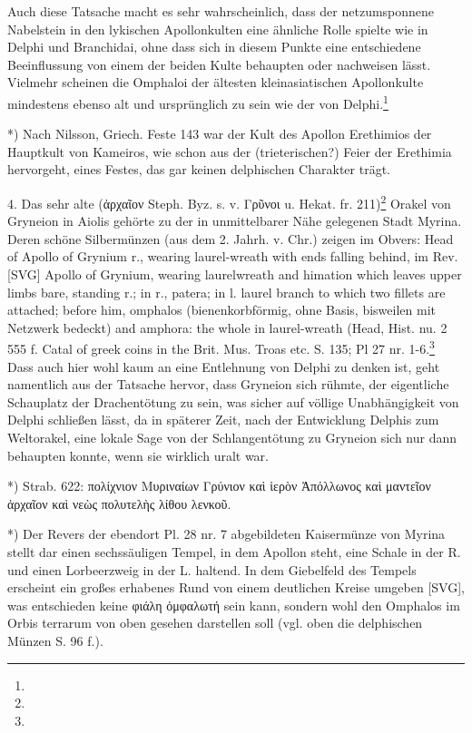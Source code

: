 \documentclass[a4paper, 11pt, oneside]{article}
\begin{document}
Auch diese Tatsache macht es sehr wahrscheinlich, dass der netzumsponnene Nabelstein in den lykischen Apollonkulten eine ähnliche Rolle spielte wie in Delphi und Branchidai, ohne dass sich in diesem Punkte eine entschiedene Beeinflussung von einem der beiden Kulte behaupten oder nachweisen lässt. Vielmehr scheinen die Omphaloi der ältesten kleinasiatischen Apollonkulte mindestens ebenso alt und ursprünglich zu sein wie der von Delphi.\footnote{}

*) Nach Nilsson, Griech. Feste 143 war der Kult des Apollon Erethimios der Hauptkult von Kameiros, wie schon aus der (trieterischen?) Feier der Erethimia hervorgeht, eines Festes, das gar keinen delphischen Charakter trägt.

4. Das sehr alte (ἀρχαῖον Steph. Byz. s. v. Γρῦνοι u. Hekat. fr. 211)\footnote{} Orakel von Gryneion in Aiolis gehörte zu der in unmittelbarer Nähe gelegenen Stadt Myrina. Deren schöne Silbermünzen (aus dem 2. Jahrh. v. Chr.) zeigen im Obvers: Head of Apollo of Grynium r., wearing laurel-wreath with ends falling behind, im Rev. [SVG] Apollo of Grynium, wearing laurelwreath and himation which leaves upper limbs bare, standing r.; in r., patera; in l. laurel branch to which two fillets are attached; before him, omphalos (bienenkorbförmig, ohne Basis, bisweilen mit Netzwerk bedeckt) and amphora: the whole in laurel-wreath (Head, Hist. nu. 2 555 f. Catal of greek coins in the Brit. Mus. Troas etc. S. 135; Pl 27 nr. 1-6.\footnote{} Dass auch hier wohl kaum an eine Entlehnung von Delphi zu denken ist, geht namentlich aus der Tatsache hervor, dass Gryneion sich rühmte, der eigentliche Schauplatz der Drachentötung zu sein, was sicher auf völlige Unabhängigkeit von Delphi schließen lässt, da in späterer Zeit, nach der Entwicklung Delphis zum Weltorakel, eine lokale Sage von der Schlangentötung zu Gryneion sich nur dann behaupten konnte, wenn sie wirklich uralt war.

*) Strab. 622: πολίχνιον Μυριναίων Γρύνιον καὶ ἱερὸν Ἀπόλλωνος καὶ μαντεῖον ἀρχαῖον καὶ νεὼς πολυτελὴς λίθου λενκοῦ.

*) Der Revers der ebendort Pl. 28 nr. 7 abgebildeten Kaisermünze von Myrina stellt dar einen sechssäuligen Tempel, in dem Apollon steht, eine Schale in der R. und einen Lorbeerzweig in der L. haltend. In dem Giebelfeld des Tempels erscheint ein großes erhabenes Rund von einem deutlichen Kreise umgeben [SVG], was entschieden keine φιάλη ὀμφαλωτή sein kann, sondern wohl den Omphalos im Orbis terrarum von oben gesehen darstellen soll (vgl. oben die delphischen Münzen S. 96 f.).
\end{document}
